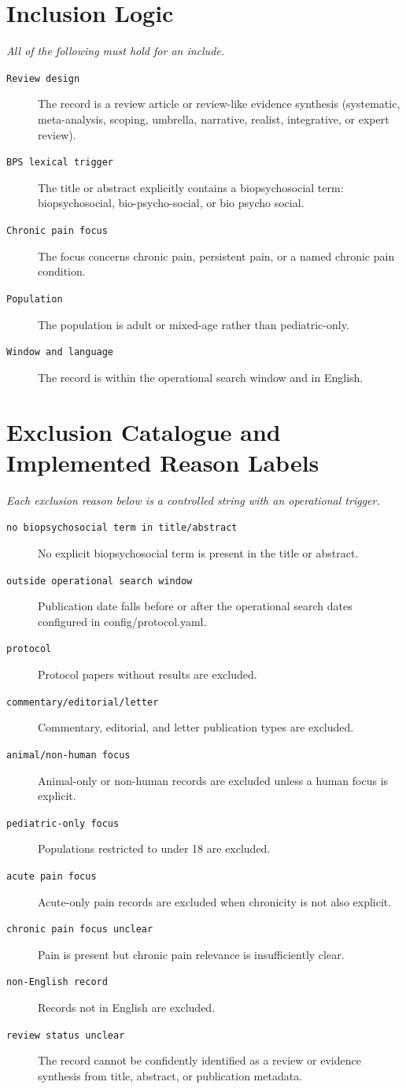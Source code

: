 \documentclass[11pt]{article}
\begin{document}
\section*{Inclusion Logic}
{\small\itshape All of the following must hold for an include.}\par\smallskip
\begin{description}
\item[\texttt{Review design}] The record is a review article or review-like evidence synthesis (systematic, meta-analysis, scoping, umbrella, narrative, realist, integrative, or expert review).
\item[\texttt{BPS lexical trigger}] The title or abstract explicitly contains a biopsychosocial term: biopsychosocial, bio-psycho-social, or bio psycho social.
\item[\texttt{Chronic pain focus}] The focus concerns chronic pain, persistent pain, or a named chronic pain condition.
\item[\texttt{Population}] The population is adult or mixed-age rather than pediatric-only.
\item[\texttt{Window and language}] The record is within the operational search window and in English.
\end{description}

\section*{Exclusion Catalogue and Implemented Reason Labels}
{\small\itshape Each exclusion reason below is a controlled string with an operational trigger.}\par\smallskip
\begin{description}
\item[\texttt{no biopsychosocial term in title/abstract}] No explicit biopsychosocial term is present in the title or abstract.
\item[\texttt{outside operational search window}] Publication date falls before or after the operational search dates configured in config/protocol.yaml.
\item[\texttt{protocol}] Protocol papers without results are excluded.
\item[\texttt{commentary/editorial/letter}] Commentary, editorial, and letter publication types are excluded.
\item[\texttt{animal/non-human focus}] Animal-only or non-human records are excluded unless a human focus is explicit.
\item[\texttt{pediatric-only focus}] Populations restricted to under 18 are excluded.
\item[\texttt{acute pain focus}] Acute-only pain records are excluded when chronicity is not also explicit.
\item[\texttt{chronic pain focus unclear}] Pain is present but chronic pain relevance is insufficiently clear.
\item[\texttt{non-English record}] Records not in English are excluded.
\item[\texttt{review status unclear}] The record cannot be confidently identified as a review or evidence synthesis from title, abstract, or publication metadata.
\end{description}
\end{document}
